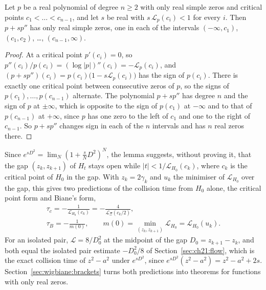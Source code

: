 \begin{lemma}\label{lem:wigbiane:onestep}
Let $p$ be a real polynomial of degree $n\ge2$ with only real simple zeros and critical points $c_1<\dots<c_{n-1}$, and let $s$ be real with $s\,\mathcal L_p(c_i)<1$ for every $i$. Then $p+sp''$ has only real simple zeros, one in each of the intervals $(-\infty,c_1)$, $(c_1,c_2)$, \dots, $(c_{n-1},\infty)$.
\end{lemma}

\begin{proof}
At a critical point $p'(c_i)=0$, so $p''(c_i)/p(c_i)=(\log|p|)''(c_i)=-\mathcal L_p(c_i)$, and $(p+sp'')(c_i)=p(c_i)\big(1-s\mathcal L_p(c_i)\big)$ has the sign of $p(c_i)$. There is exactly one critical point between consecutive zeros of $p$, so the signs of $p(c_1),\dots,p(c_{n-1})$ alternate. The polynomial $p+sp''$ has degree $n$ and the sign of $p$ at $\pm\infty$, which is opposite to the sign of $p(c_1)$ at $-\infty$ and to that of $p(c_{n-1})$ at $+\infty$, since $p$ has one zero to the left of $c_1$ and one to the right of $c_{n-1}$. So $p+sp''$ changes sign in each of the $n$ intervals and has $n$ real zeros there.
\end{proof}

Since $e^{sD^2}=\lim_N(1+\frac sND^2)^N$, the lemma suggests, without proving it, that the gap $(z_k,z_{k+1})$ of $H_t$ stays open while $|t|<1/\mathcal L_{H_0}(c_k)$, where $c_k$ is the critical point of $H_0$ in the gap. With $z_k=2\gamma_k$ and $u_k$ the minimiser of $\mathcal L_{H_0}$ over the gap, this gives two predictions of the collision time from $H_0$ alone, the critical point form and Biane's form,
\begin{gather*}
\tau_c=-\frac1{\mathcal L_{H_0}(c_k)}=-\frac4{\mathcal L_\Xi(c_k/2)},\\
\tau_B=-\frac1{m(0)},\qquad m(0)=\min_{(z_k,z_{k+1})}\mathcal L_{H_0}=\mathcal L_{H_0}(u_k).
\end{gather*}
For an isolated pair, $\mathcal L=8/D_0^2$ at the midpoint of the gap $D_0=z_{k+1}-z_k$, and both equal the isolated pair estimate $-D_0^2/8$ of Section~\ref{sec:ch21:flow}, which is the exact collision time of $z^2-a^2$ under $e^{sD^2}$, since $e^{sD^2}(z^2-a^2)=z^2-a^2+2s$. Section~\ref{sec:wigbiane:brackets} turns both predictions into theorems for functions with only real zeros.

